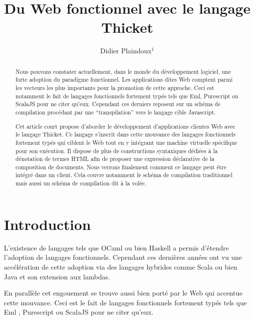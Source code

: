 \documentclass[twoside,a4paper]{article}
\title{ Du Web fonctionnel avec le langage Thicket }
\author{Didier Plaindoux$^1$}
\affiliation{\begin{tabular}{rr} 
    \\ 1:  Fungus, Le village 31430 Gratens, France
    \\     {\tt d.plaindoux@fungus.fr}
\end{tabular}}
\begin{document}
\setcounter{page}{1}
\maketitle

\begin{abstract}
Nous pouvons  constater actuellement,  dans le monde  du développement
logiciel,   une  forte   adoption   du   paradigme  fonctionnel.   Les
applications  dites   Web  comptent  parmi  les   vecteurs  les  plus
importants pour la promotion de  cette approche. Ceci est notamment le
fait de langages fonctionnels fortement typés tels que Eml, Purescript
ou ScalaJS pour  ne citer qu’eux. Cependant ces  derniers reposent sur
un schéma  de compilation  procédant par  une “transpilation”  vers le
langage cible Javascript.

Cet article  court propose  d'aborder le  développement d'applications
clientes Web avec le langage  Thicket. Ce langage s’inscrit dans cette
mouvance des langages fonctionnels fortement  typés qui ciblent le Web
tout  en  y  intégrant  une  machine  virtuelle  spécifique  pour  son
exécution. Il dispose  de plus de constructions  syntaxiques dédiées à
la  dénotation  de  termes  HTML   afin  de  proposer  une  expression
déclarative de  la composition  de documents. Nous  verrons finalement
comment  ce langage  peut être  intégré  dans un  client. Cela  couvre
notamment le schéma  de compilation traditionnel mais  aussi un schéma
de compilation dit à la volée.
\end{abstract}

\section{Introduction}

L'existence de  langages tels que  OCaml \cite{ocaml} ou  bien Haskell
\cite{haskell}   a    permis   d'étendre   l'adoption    de   langages
fonctionnels. Cependant  ces dernières années ont  vu une accélération
de cette adoption  via des langages hybrides  comme Scala \cite{scala}
ou bien Java \cite{java} et son extension aux lambdas.

En parallèle cet engouement se trouve  aussi bien porté par le Web qui
accentue cette  mouvance. Ceci  est le  fait de  langages fonctionnels
fortement typés tels que  Eml \cite{elm}, Purescript \cite{purescript}
ou  ScalaJS  \cite{scalajs}  pour   ne  citer  qu’eux. 
\end{document}
